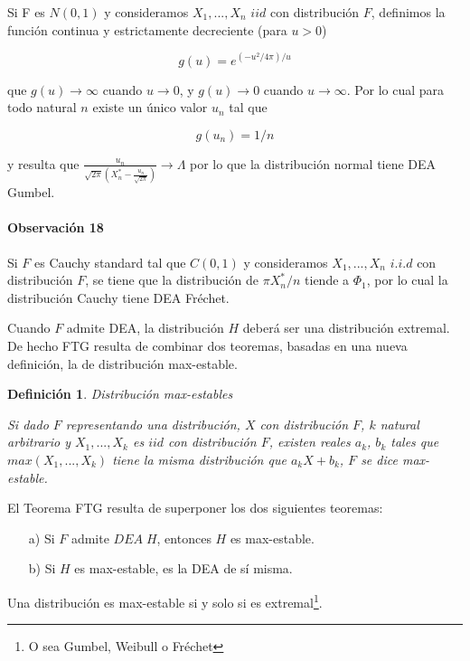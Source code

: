 \documentclass[
  12pt]{article}
\newtheorem{definition}{Definición}[section]
\begin{document}
Si F es \(N(0,1)\) y consideramos \(X_1,...,X_n\) \(iid\) con
distribución \(F\), definimos la función continua y estrictamente
decreciente (para \(u>0\))

\[
g(u)=e^{(-u^2/4\pi)/u}
\]

que \(g(u)\rightarrow \infty\) cuando \(u\rightarrow 0\), y
\(g(u)\rightarrow 0\) cuando \(u\rightarrow \infty\). Por lo cual para
todo natural \(n\) existe un único valor \(u_n\) tal que

\[
g(u_n)=1/n
\]

y resulta que
\(\frac{u_n}{\sqrt{2\pi}\left (X_n^*-\frac{u_n}{\sqrt{2\pi}}\right )}\longrightarrow \Lambda\)
por lo que la distribución normal tiene DEA Gumbel.

\paragraph*{Observación 18}

Si \(F\) es Cauchy standard tal que \(C(0,1)\) y consideramos
\(X_1,...,X_n\) \(i.i.d\) con distribución \(F\), se tiene que la
distribución de \(\pi X^*_n/n\) tiende a \(\Phi_1\), por lo cual la
distribución Cauchy tiene DEA Fréchet.

Cuando \(F\) admite DEA, la distribución \(H\) deberá ser una
distribución extremal. De hecho FTG resulta de combinar dos teoremas,
basadas en una nueva definición, la de distribución max-estable.

\begin{definition} Distribución max-estables

Si dado $F$ representando una distribución, $X$ con distribución $F$, $k$ natural arbitrario y $X_1,...,X_k$ es $iid$ con distribución $F$, existen reales $a_k$, $b_k$ tales que $max(X_1,...,X_k)$ tiene la misma distribución que $a_k X+ b_k$, $F$ se dice \textit{max-estable}.
\end{definition}

El Teorema FTG resulta de superponer los dos siguientes teoremas:

\begin{theorem} 
\begin{itemize}
  \item[a)] Si $F$ admite $DEA\;H$, entonces $H$ es max-estable.
  \item[b)] Si $H$ es max-estable, es la DEA de sí misma.
\end{itemize}
\end{theorem}

\begin{theorem}
Una distribución es max-estable si y solo si es extremal\footnote{O sea Gumbel, Weibull o Fréchet}.
\end{theorem}
\end{document}
